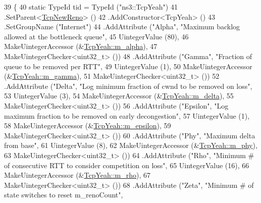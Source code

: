 \begin{DoxyCode}
39 \{
40   \textcolor{keyword}{static} TypeId tid = TypeId (\textcolor{stringliteral}{"ns3::TcpYeah"})
41     .SetParent<\hyperlink{classns3_1_1TcpNewReno_a81686cb1590be6d7c754029fc8d7cf4e}{TcpNewReno}> ()
42     .AddConstructor<TcpYeah> ()
43     .SetGroupName (\textcolor{stringliteral}{"Internet"})
44     .AddAttribute (\textcolor{stringliteral}{"Alpha"}, \textcolor{stringliteral}{"Maximum backlog allowed at the bottleneck queue"},
45                    UintegerValue (80),
46                    MakeUintegerAccessor (&\hyperlink{classns3_1_1TcpYeah_aa61ce240a53170a18b44144abe864def}{TcpYeah::m\_alpha}),
47                    MakeUintegerChecker<uint32\_t> ())
48     .AddAttribute (\textcolor{stringliteral}{"Gamma"}, \textcolor{stringliteral}{"Fraction of queue to be removed per RTT"},
49                    UintegerValue (1),
50                    MakeUintegerAccessor (&\hyperlink{classns3_1_1TcpYeah_ae9bf0e2021209e59fe5fddd2afff6c22}{TcpYeah::m\_gamma}),
51                    MakeUintegerChecker<uint32\_t> ())
52     .AddAttribute (\textcolor{stringliteral}{"Delta"}, \textcolor{stringliteral}{"Log minimum fraction of cwnd to be removed on loss"},
53                    UintegerValue (3),
54                    MakeUintegerAccessor (&\hyperlink{classns3_1_1TcpYeah_af36b0f4c1017a437469d909a22650f84}{TcpYeah::m\_delta}),
55                    MakeUintegerChecker<uint32\_t> ())
56     .AddAttribute (\textcolor{stringliteral}{"Epsilon"}, \textcolor{stringliteral}{"Log maximum fraction to be removed on early decongestion"},
57                    UintegerValue (1),
58                    MakeUintegerAccessor (&\hyperlink{classns3_1_1TcpYeah_acd0da743a9c773afb1f4e295bc95b22c}{TcpYeah::m\_epsilon}),
59                    MakeUintegerChecker<uint32\_t> ())
60     .AddAttribute (\textcolor{stringliteral}{"Phy"}, \textcolor{stringliteral}{"Maximum delta from base"},
61                    UintegerValue (8),
62                    MakeUintegerAccessor (&\hyperlink{classns3_1_1TcpYeah_abcb83c9c36e0dbc75a19c4af8e08f8ad}{TcpYeah::m\_phy}),
63                    MakeUintegerChecker<uint32\_t> ())
64     .AddAttribute (\textcolor{stringliteral}{"Rho"}, \textcolor{stringliteral}{"Minimum # of consecutive RTT to consider competition on loss"},
65                    UintegerValue (16),
66                    MakeUintegerAccessor (&\hyperlink{classns3_1_1TcpYeah_ada328f61ed71f07744835de4bf78927c}{TcpYeah::m\_rho}),
67                    MakeUintegerChecker<uint32\_t> ())
68     .AddAttribute (\textcolor{stringliteral}{"Zeta"}, \textcolor{stringliteral}{"Minimum # of state switches to reset m\_renoCount"},

\end{DoxyCode}
